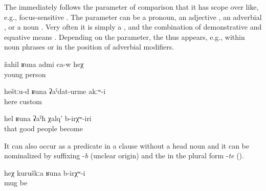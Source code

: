 The    immediately follows the parameter of comparison that it has scope over like, e.g., focus-sensitive . The parameter can be a pronoun, an adjective , an adverbial , or a noun . Very often it is simply a , and the combination of demonstrative and equative  means  . Depending on the parameter, the  thus appears, e.g., within noun phrases  or in the position of adverbial modifiers.
%
\begin{exe}
	\ex	\label{ex:He is like a young man}
	\gll	žahil	ʁuna	admi	ca-w	heχ\\
		young		person		\\
	\glt	{}

	\ex	\label{ex:There were not such customs as here}
	\gll	heštːu-d	ʁuna	ʡaˁdat-urme	akːʷ-i\\
		here		custom	\\
	\glt	{}

	\ex	\label{ex:They were so good people}
	\gll	hel	ʁuna	ʡaˁħ	χalq'	b-irχʷ-iri\\
		that		good	people	become\\
	\glt	{}
\end{exe}

It can also occur as a predicate in a  clause without a head noun and it can be nominalized by suffixing -\textit{b} (unclear origin) and the  in the plural form -\textit{te} ().
%
\begin{exe}
	\ex	\label{ex:This was like a mug}
	\gll	heχ	kuruškːa	ʁuna	b-irχʷ-i\\
			mug 	be\\
	\glt	{}
\end{exe}

